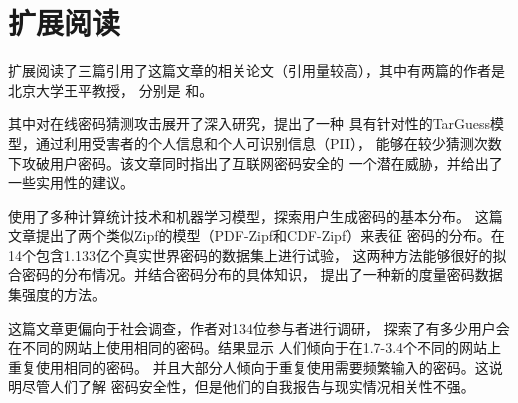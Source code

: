 \section{扩展阅读}



扩展阅读了三篇引用了这篇文章的相关论文（引用量较高），其中有两篇的作者是北京大学王平教授，
分别是\cite{wang2016targeted}
和\cite{wang2017zipf}。

其中\cite{wang2016targeted}对在线密码猜测攻击展开了深入研究，提出了一种
具有针对性的TarGuess模型，通过利用受害者的个人信息和个人可识别信息（PII），
能够在较少猜测次数下攻破用户密码。该文章同时指出了互联网密码安全的
一个潜在威胁，并给出了一些实用性的建议。

\cite{wang2017zipf}使用了多种计算统计技术和机器学习模型，探索用户生成密码的基本分布。
这篇文章提出了两个类似Zipf的模型（PDF-Zipf和CDF-Zipf）来表征
密码的分布。在14个包含1.133亿个真实世界密码的数据集上进行试验，
这两种方法能够很好的拟合密码的分布情况。并结合密码分布的具体知识，
提出了一种新的度量密码数据集强度的方法。

\cite{197316}这篇文章更偏向于社会调查，作者对134位参与者进行调研，
探索了有多少用户会在不同的网站上使用相同的密码。结果显示
人们倾向于在1.7-3.4个不同的网站上重复使用相同的密码。
并且大部分人倾向于重复使用需要频繁输入的密码。这说明尽管人们了解
密码安全性，但是他们的自我报告与现实情况相关性不强。




